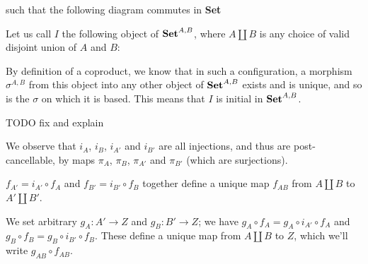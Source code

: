 \documentclass[12pt, letterpaper, twoside]{report}
\begin{document}
such that the following diagram commutes in \textbf{Set}


Let us call $I$ the following object of $\text{\textbf{Set}}^{A,B}$, where $A \coprod B$ is any choice of valid disjoint union of $A$ and $B$:


By definition of a coproduct, we know that in such a configuration, a morphism $\sigma^{A,B}$ from this object into any other object of $\text{\textbf{Set}}^{A,B}$ exists and is unique, and so is the $\sigma$ on which it is based. This means that $I$ is initial in $\text{\textbf{Set}}^{A,B}$.

TODO fix and explain

We observe that $i_A$, $i_B$, $i_{A'}$ and $i_{B'}$ are all injections, and thus are post-cancellable, by maps $\pi_A$, $\pi_B$, $\pi_{A'}$ and $\pi_{B'}$ (which are surjections).

$f_{A'} = i_{A'} \circ f_A$ and $f_{B'} = i_{B'} \circ f_B$ together define a unique map $f_{AB}$ from $A \coprod B$ to $A' \coprod B'$.

We set arbitrary $g_A : A' \to Z$ and $g_B : B' \to Z$; we have $g_A \circ f
_A = g_A \circ i_{A'} \circ f_A$ and $g_B \circ f_B = g_B \circ i_{B'} \circ f_B$. These define a unique map from $A \coprod B$ to $Z$, which we'll write $g_{AB} \circ f_{AB}$.
\end{document}
